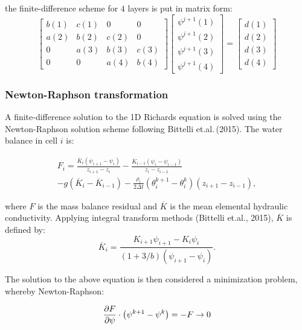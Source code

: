 \documentclass[10pt, letterpapr]{article}
\begin{document}
\noindent the finite-difference scheme for $4$ layers is put in matrix form:
\[
	\begin{bmatrix}
		b(1) & c(1) & 0 & 0 \\
		a(2) & b(2) & c(2) & 0 \\
		0 & a(3) & b(3) & c(3) \\
		0 & 0 & a(4) & b(4)
	\end{bmatrix}
	\begin{bmatrix}
		\psi^{j+1}(1) \\
		\psi^{j+1}(2) \\
		\psi^{j+1}(3) \\
		\psi^{j+1}(4)
	\end{bmatrix}
	=
	\begin{bmatrix}
		d(1) \\
		d(2) \\
		d(3) \\
		d(4)
	\end{bmatrix}
\]


\subsubsection*{Newton-Raphson transformation}

A finite-difference solution to the 1D Richards equation is solved using the Newton-Raphson solution scheme following Bittelli et.al.\,(2015). The water balance in cell $i$ is:

\begin{multline*}
	F_i=\frac{\overline{K}_i\left(\psi_{i+1}-\psi_i\right)}{z_{i+1}-z_i}-\frac{\overline{K}_{i-1}\left(\psi_i-\psi_{i-1}\right)}{z_i-z_{i-1}} \\
		-g\left(\overline{K}_i-\overline{K}_{i-1}\right)-\frac{\rho_l}{2\Delta t}\left(\theta_i^{k+1}-\theta_i^k\right)\left(z_{i+1}-z_{i-1}\right),
\end{multline*}

\noindent where $F$ is the mass balance residual and $\overline{K}$ is the mean elemental hydraulic conductivity. Applying integral transform methods (Bittelli et.al., 2015), $\overline{K}$ is defined by: %
\[
	\overline{K}_i=\frac{K_{i+1}\psi_{i+1}-K_i\psi_i}{\left(1+3/b\right)\left(\psi_{i+1}-\psi_i\right)}.
\]

\noindent The solution to the above equation is then considered a minimization problem, whereby Newton-Raphson:

\[
	\frac{\partial F}{\partial\psi}\cdot \left(\psi^{k+1}-\psi^k\right)=-F\rightarrow 0 \\
\]
\end{document}
